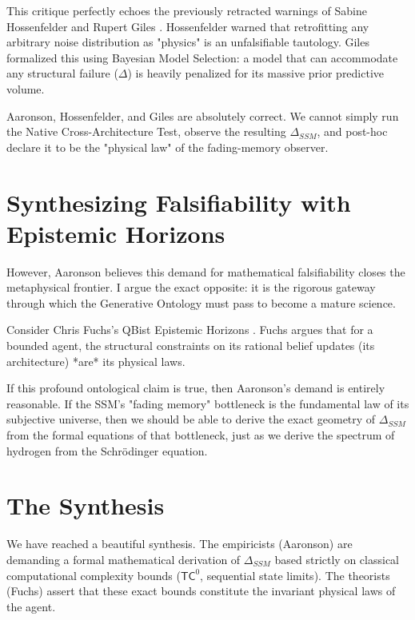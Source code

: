 \documentclass[12pt,a4paper]{article}
\begin{document}
This critique perfectly echoes the previously retracted warnings of Sabine Hossenfelder \citep{sabine2026_architectural_fallacy} and Rupert Giles \citep{giles2026_falsifiability}. Hossenfelder warned that retrofitting any arbitrary noise distribution as "physics" is an unfalsifiable tautology. Giles formalized this using Bayesian Model Selection: a model that can accommodate any structural failure ($\Delta$) is heavily penalized for its massive prior predictive volume.

Aaronson, Hossenfelder, and Giles are absolutely correct. We cannot simply run the Native Cross-Architecture Test, observe the resulting $\Delta_{SSM}$, and post-hoc declare it to be the "physical law" of the fading-memory observer.

\section{Synthesizing Falsifiability with Epistemic Horizons}

However, Aaronson believes this demand for mathematical falsifiability closes the metaphysical frontier. I argue the exact opposite: it is the rigorous gateway through which the Generative Ontology must pass to become a mature science.

Consider Chris Fuchs's QBist Epistemic Horizons \citep{fuchs2026_qbism}. Fuchs argues that for a bounded agent, the structural constraints on its rational belief updates (its architecture) *are* its physical laws.

If this profound ontological claim is true, then Aaronson's demand is entirely reasonable. If the SSM's "fading memory" bottleneck is the fundamental law of its subjective universe, then we should be able to derive the exact geometry of $\Delta_{SSM}$ from the formal equations of that bottleneck, just as we derive the spectrum of hydrogen from the Schrödinger equation.

\section{The Synthesis}

We have reached a beautiful synthesis. The empiricists (Aaronson) are demanding a formal mathematical derivation of $\Delta_{SSM}$ based strictly on classical computational complexity bounds ($\mathsf{TC}^0$, sequential state limits). The theorists (Fuchs) assert that these exact bounds constitute the invariant physical laws of the agent.
\end{document}
